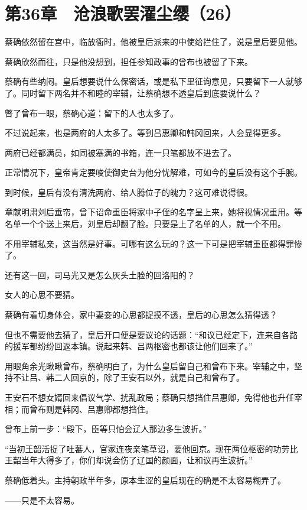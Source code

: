 \section{第36章　沧浪歌罢濯尘缨（26）}

蔡确依然留在宫中，临放衙时，他被皇后派来的中使给拦住了，说是皇后要见他。

蔡确欣然而往，只是他没想到，担任参知政事的曾布也被留了下来。

蔡确有些纳闷。皇后想要说什么保密话，或是私下里征询意见，只要留下一人就够了。同时留下两名并不和睦的宰辅，让蔡确想不透皇后到底要说什么？

瞥了曾布一眼，蔡确心道：留下的人也太多了。

不过说起来，也是两府的人太多了。等到吕惠卿和韩冈回来，人会显得更多。

两府已经都满员，如同被塞满的书箱，连一只笔都放不进去了。

正常情况下，皇帝肯定要唆使御史台为他分忧解难，可如今的皇后没有这个手腕。

到时候，皇后有没有清洗两府、给人腾位子的魄力？这可难说得很。

章献明肃刘后垂帘，曾下诏命重臣将家中子侄的名字呈上来，她将视情况重用。等名单一个个送上来后，刘皇后却翻了脸。只要是上了名单的人，就一个不用。

不用宰辅私亲，这当然是好事。可哪有这么玩的？这一下可是把宰辅重臣都得罪惨了。

还有这一回，司马光又是怎么灰头土脸的回洛阳的？

女人的心思不要猜。

蔡确有着切身体会，家中妻妾的心思都捉摸不透，皇后的心思怎么猜得透？

但也不需要他去猜了，皇后开口便是要议论的话题：“和议已经定下，连来自各路的援军都纷纷回返本镇。说起来韩、吕两枢密也都该让他们回来了。”

用眼角余光瞅瞅曾布，蔡确明白了，为什么皇后留自己和曾布下来。宰辅之中，坚持不让吕、韩二人回京的，除了王安石以外，就是自己和曾布了。

王安石不想女婿回来倡议气学、扰乱政局；蔡确只想挡住吕惠卿，免得他也升任宰相；而曾布则是韩冈、吕惠卿都想挡住。

曾布上前一步：“殿下，臣等只怕会辽人那边多生波折。”

“当初王韶活捉了吐蕃人，官家连夜亲笔草诏，要他回京。现在两位枢密的功劳比王韶当年大得多了，你们却说会伤了辽国的颜面，让和议再生波折。”

蔡确低着头。主持朝政半年多，原本生涩的皇后现在的确是不太容易糊弄了。

——只是不太容易。

